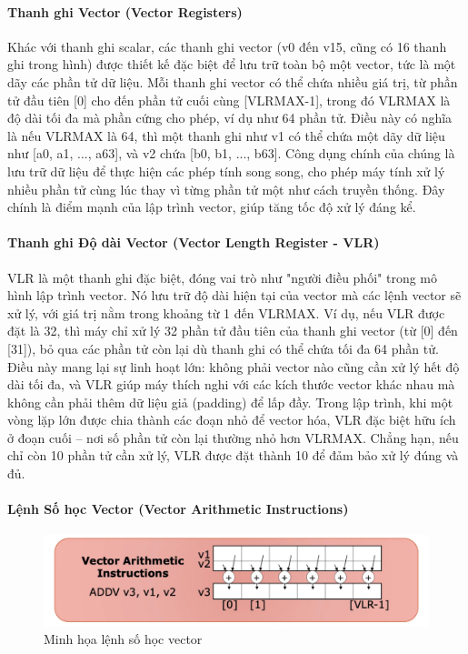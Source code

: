 \documentclass[a4paper]{article}
\begin{document}
\paragraph{Thanh ghi Vector (Vector Registers)}

Khác với thanh ghi scalar, các thanh ghi vector (v0 đến v15, cũng có 16 thanh ghi trong hình) được thiết kế đặc biệt để lưu trữ toàn bộ một vector, tức là một dãy các phần tử dữ liệu. Mỗi thanh ghi vector có thể chứa nhiều giá trị, từ phần tử đầu tiên [0] cho đến phần tử cuối cùng [VLRMAX-1], trong đó VLRMAX là độ dài tối đa mà phần cứng cho phép, ví dụ như 64 phần tử. Điều này có nghĩa là nếu VLRMAX là 64, thì một thanh ghi như v1 có thể chứa một dãy dữ liệu như [a0, a1, ..., a63], và v2 chứa [b0, b1, ..., b63]. Công dụng chính của chúng là lưu trữ dữ liệu để thực hiện các phép tính song song, cho phép máy tính xử lý nhiều phần tử cùng lúc thay vì từng phần tử một như cách truyền thống. Đây chính là điểm mạnh của lập trình vector, giúp tăng tốc độ xử lý đáng kể.

\paragraph{Thanh ghi Độ dài Vector (Vector Length Register - VLR)}

VLR là một thanh ghi đặc biệt, đóng vai trò như "người điều phối" trong mô hình lập trình vector. Nó lưu trữ độ dài hiện tại của vector mà các lệnh vector sẽ xử lý, với giá trị nằm trong khoảng từ 1 đến VLRMAX. Ví dụ, nếu VLR được đặt là 32, thì máy chỉ xử lý 32 phần tử đầu tiên của thanh ghi vector (từ [0] đến [31]), bỏ qua các phần tử còn lại dù thanh ghi có thể chứa tối đa 64 phần tử. Điều này mang lại sự linh hoạt lớn: không phải vector nào cũng cần xử lý hết độ dài tối đa, và VLR giúp máy thích nghi với các kích thước vector khác nhau mà không cần phải thêm dữ liệu giả (padding) để lấp đầy. Trong lập trình, khi một vòng lặp lớn được chia thành các đoạn nhỏ để vector hóa, VLR đặc biệt hữu ích ở đoạn cuối – nơi số phần tử còn lại thường nhỏ hơn VLRMAX. Chẳng hạn, nếu chỉ còn 10 phần tử cần xử lý, VLR được đặt thành 10 để đảm bảo xử lý đúng và đủ.

\paragraph{Lệnh Số học Vector (Vector Arithmetic Instructions)}

\begin{figure}[H]
    \centering
    \includegraphics[width=1\linewidth]{assets/vector-arithmetic-instructions.png}
    \caption{Minh họa lệnh số học vector}
    \label{fig:enter-label}
\end{figure}
\end{document}
